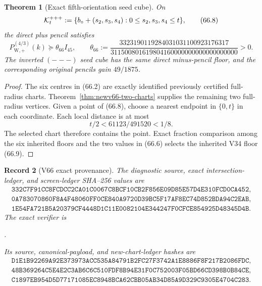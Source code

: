 \documentclass[11pt,oneside]{article}
\newtheorem{theorem}{Theorem}[section]
\newtheorem{record}[theorem]{Record}
\theoremstyle{definition}
\theoremstyle{remark}
\begin{document}
\begin{theorem}[Exact fifth-orientation seed cube]
\label{thm:newv66-seed-cube}
On
\[
 {\cal K}^{+++}_t:=
 \{b_\circ+(s_2,s_3,s_4):0\le s_2,s_3,s_4\le t\},    \tag{66.8}
\]
the direct plus pencil satisfies
\[
 P_{\mathrm W,+}^{(4/3)}(k)
 \succeq\theta_{66}I_{45},\qquad
 \theta_{66}:=
 \frac{3323190119284031031100923176317}
 {311500801619804160000000000000000000}>0.           \tag{66.9}
\]
The inverted \((---)\) seed cube has the same direct minus-pencil
floor, and the corresponding original pencils gain \(49/1875\).
\end{theorem}

\begin{proof}
The six centres in (66.2) are exactly identified previously
certified full-radius charts.  Theorem~\ref{thm:newv66-two-charts}
supplies the remaining two full-radius vertices.  Given a point of
(66.8), choose a nearest endpoint in \(\{0,t\}\) in each
coordinate.  Each local distance is at most
\[
 t/2<61123/491520<1/8.                                \tag{66.10}
\]
The selected chart therefore contains the point.  Exact fraction
comparison among the six inherited floors and the two values in
(66.6) selects the inherited V34 floor (66.9).
\end{proof}

\begin{record}[V66 exact provenance]
\label{rec:newv66-provenance}
The diagnostic source, exact intersection-ledger, and screen-ledger
SHA--256 values are
\[
\begin{gathered}
\texttt{332C7F91CC8FCDCC2CA01C0067C8BCF10CB2F856E09D85E57D4E310FCD0CA452},\\
\texttt{0A783070860F8A4F48060FF0CE840A9720D39BC5F17AF8EC74D852BDA94C2EAB},\\
\texttt{1E54FA721B5A20379CF4448D1C11E0082104E344247F0CFCE854925D48345D4B}.
\end{gathered}                                        \tag{66.11}
\]
The exact verifier is
\begin{center}
\footnotesize
{}.
\end{center}
Its source, canonical-payload, and new-chart-ledger hashes are
\[
\begin{gathered}
\texttt{D1E1B92269A92E373973ACC535A84791B2FC27F3742A1E8886F8F217B2086FDC},\\
\texttt{48B369264C5E4E2C3AB6C6C510FDF8B94E31F0C752003F05BD66CD398B0B84CE},\\
\texttt{C1897EB954D5D77171085EC8948BCA62CBB05AB34D85A9D329C9305E4704C283}.
\end{gathered}                                        \tag{66.12}
\]
\end{record}
\end{document}
